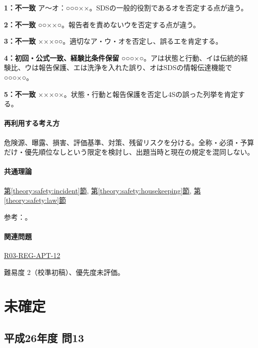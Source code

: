\noindent\textbf{1：不一致} ア〜オ：○○○××。SDSの一般的役割であるオを否定する点が違う。\par

\noindent\textbf{2：不一致} ○○××○。報告者を責めないウを否定する点が違う。\par

\noindent\textbf{3：不一致} ×××○○。適切なア・ウ・オを否定し、誤るエを肯定する。\par

\noindent\textbf{4：初回・公式一致、経験比条件保留} ○○○×○。アは状態と行動、イは伝統的経験比、ウは報告保護、エは洗浄を入れた誤り、オはSDSの情報伝達機能で○○○×○。\par

\noindent\textbf{5：不一致} ×××○×。状態・行動と報告保護を否定し4Sの誤った列挙を肯定する。\par

\paragraph{再利用する考え方} 危険源、曝露、損害、評価基準、対策、残留リスクを分ける。全称・必須・予算だけ・優先順位なしという限定を検討し、出題当時と現在の規定を混同しない。

\paragraph{共通理論} \hyperref[theory:safety:incident]{第\ref*{theory:safety:incident}節}, \hyperref[theory:safety:housekeeping]{第\ref*{theory:safety:housekeeping}節}, \hyperref[theory:safety:law]{第\ref*{theory:safety:law}節}

\par 参考：\cite{saf_welfare,saf_4s,saf_chemqa}。

\paragraph{関連問題} \hyperref[q:r03-reg-apt-12]{R03-REG-APT-12}

\par 難易度 2（校準初稿）、優先度未評価。

\section{未確定}

\subsection{平成26年度 問13}
\label{q:h26-reg-apt-13}

